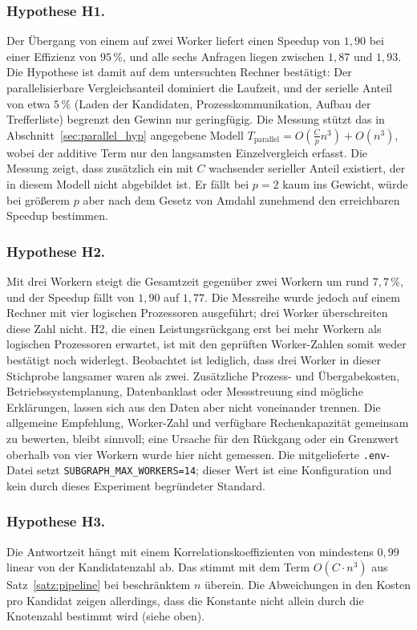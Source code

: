 \documentclass[a4paper,12pt, twoside]{report}
\theoremstyle{definition}
\begin{document}
\subsubsection{Hypothese H1.} Der Übergang von einem auf zwei Worker liefert einen Speedup von $1{,}90$ bei einer Effizienz von $95\,\%$, und alle sechs Anfragen liegen zwischen $1{,}87$ und $1{,}93$. Die Hypothese ist damit auf dem untersuchten Rechner bestätigt: Der parallelisierbare Vergleichsanteil dominiert die Laufzeit, und der serielle Anteil von etwa $5\,\%$ (Laden der Kandidaten, Prozesskommunikation, Aufbau der Trefferliste) begrenzt den Gewinn nur geringfügig. Die Messung stützt das in Abschnitt~\ref{sec:parallel_hyp} angegebene Modell $T_{\text{parallel}}=O(\frac{C}{p}n^3)+O(n^3)$, wobei der additive Term nur den langsamsten Einzelvergleich erfasst. Die Messung zeigt, dass zusätzlich ein mit $C$ wachsender serieller Anteil existiert, der in diesem Modell nicht abgebildet ist. Er fällt bei $p=2$ kaum ins Gewicht, würde bei größerem $p$ aber nach dem Gesetz von Amdahl zunehmend den erreichbaren Speedup bestimmen.

\subsubsection{Hypothese H2.} Mit drei Workern steigt die Gesamtzeit gegenüber zwei Workern um rund $7{,}7\,\%$, und der Speedup fällt von $1{,}90$ auf $1{,}77$. Die Messreihe wurde jedoch auf einem Rechner mit vier logischen Prozessoren ausgeführt; drei Worker überschreiten diese Zahl nicht. H2, die einen Leistungsrückgang erst bei mehr Workern als logischen Prozessoren erwartet, ist mit den geprüften Worker-Zahlen somit weder bestätigt noch widerlegt. Beobachtet ist lediglich, dass drei Worker in dieser Stichprobe langsamer waren als zwei. Zusätzliche Prozess- und Übergabekosten, Betriebssystemplanung, Datenbanklast oder Messstreuung sind mögliche Erklärungen, lassen sich aus den Daten aber nicht voneinander trennen. Die allgemeine Empfehlung, Worker-Zahl und verfügbare Rechenkapazität gemeinsam zu bewerten, bleibt sinnvoll; eine Ursache für den Rückgang oder ein Grenzwert oberhalb von vier Workern wurde hier nicht gemessen. Die mitgelieferte \texttt{.env}-Datei setzt \texttt{SUBGRAPH\_MAX\_WORKERS=14}; dieser Wert ist eine Konfiguration und kein durch dieses Experiment begründeter Standard.

\subsubsection{Hypothese H3.} Die Antwortzeit hängt mit einem Korrelationskoeffizienten von mindestens $0{,}99$ linear von der Kandidatenzahl ab. Das stimmt mit dem Term $O(C\cdot n^3)$ aus Satz~\ref{satz:pipeline} bei beschränktem $n$ überein. Die Abweichungen in den Kosten pro Kandidat zeigen allerdings, dass die Konstante nicht allein durch die Knotenzahl bestimmt wird (siehe oben).
\end{document}
